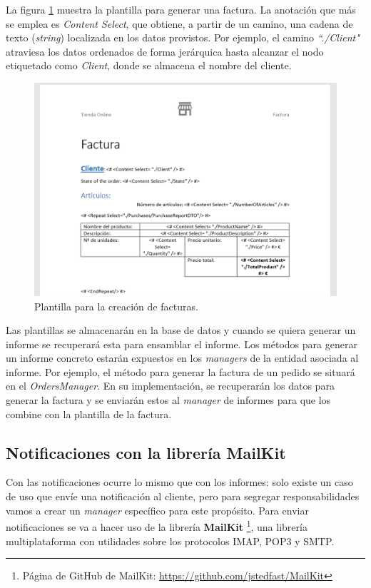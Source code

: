 \documentclass[11pt,spanish,listoffigures]{tfgetsinf}
\begin{document}
La figura \ref{fig:Factura} muestra la plantilla para generar una factura. La anotación que más se emplea es \textit{Content Select}, que obtiene, a partir de un camino, una cadena de texto (\textit{string}) localizada en los datos provistos. Por ejemplo, el camino \textit{``./Client"} atraviesa los datos ordenados de forma jerárquica hasta alcanzar el nodo etiquetado como \textit{Client}, donde se almacena el nombre del cliente.

\begin{figure}[h]
\centering
\includegraphics[scale=0.5]{Factura}
\caption{Plantilla para la creación de facturas.}
\label{fig:Factura}
\end{figure}

Las plantillas se almacenarán en la base de datos y cuando se quiera generar un informe se recuperará esta para ensamblar el informe. Los métodos para generar un informe concreto estarán expuestos en los \textit{managers} de la entidad asociada al informe. Por ejemplo, el método para generar la factura de un pedido se situará en el \textit{OrdersManager}. En su implementación, se recuperarán los datos para generar la factura y se enviarán estos al \textit{manager} de informes para que los combine con la plantilla de la factura.

\newpage

\subsection{Notificaciones con la librería MailKit}

Con las notificaciones ocurre lo mismo que con los informes: solo existe un caso de uso que envíe una notificación al cliente, pero para segregar responsabilidades vamos a crear un \textit{manager} específico para este propósito. Para enviar notificaciones se va a hacer uso de la librería \textbf{MailKit} \footnote{ Página de GitHub de MailKit: \url{https://github.com/jstedfast/MailKit}}, una librería multiplataforma con utilidades sobre los protocolos IMAP, POP3 y SMTP.
\end{document}
